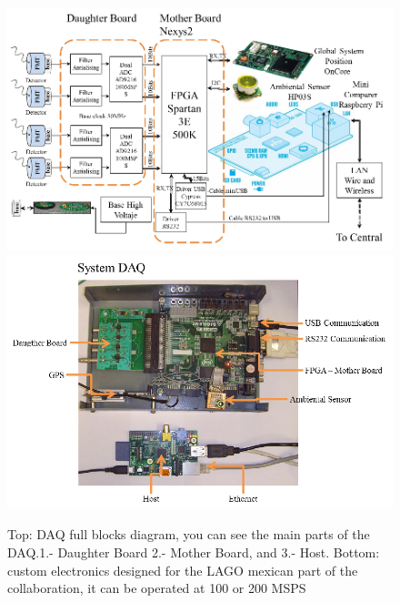 
\begin{figure}[t]
\centering
\includegraphics[scale=0.5]{images/mexico/sitelago-02.png}
\includegraphics[scale=0.69]{images/mexico/sitelago-03.png}
\caption{Top: DAQ full blocks diagram, you can see the main parts of the DAQ.1.- Daughter Board 2.- Mother Board, and 3.- Host. Bottom: custom electronics designed for the LAGO mexican part of the collaboration, it can be operated at 100 or 200 MSPS}
\label{fig:electronics-m}
\end{figure} 

